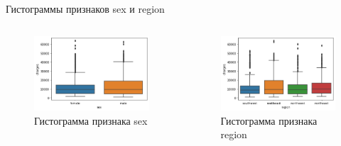 \documentclass[c]{beamer}  %
\begin{document}
	\begin{frame}
		\frametitle{\insertsection}

		\begin{block}{Гистограммы признаков sex и region}
			\begin{columns}[onlytextwidth,T]
				\begin{figure}[H]
					\centering
					\includegraphics[scale=0.35]{sex_boxplot.png}
					\caption{Гистограмма признака sex}
					\label{img:sex_boxplot}
				\end{figure}
				\begin{figure}[H]
					\centering
					\includegraphics[scale=0.35]{region_boxplot.png}
					\caption{Гистограмма признака region}
					\label{img:region_boxplot}
				\end{figure}
			\end{columns}
		\end{block}
	\end{frame}
\end{document}
